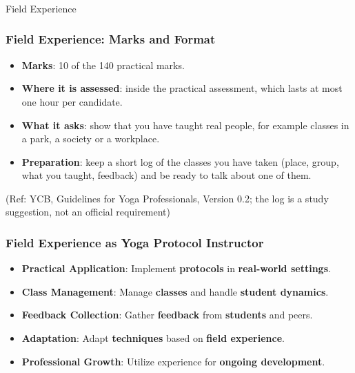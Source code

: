 \begin{frame}[fragile]\frametitle{}
\begin{center}
{\Large Field Experience }
\end{center}
\end{frame}

\begin{frame}[fragile]\frametitle{Field Experience: Marks and Format}
\begin{itemize}
\item \textbf{Marks}: 10 of the 140 practical marks.
\item \textbf{Where it is assessed}: inside the practical assessment, which lasts at most one hour per candidate.
\item \textbf{What it asks}: show that you have taught real people, for example classes in a park, a society or a workplace.
\item \textbf{Preparation}: keep a short log of the classes you have taken (place, group, what you taught, feedback) and be ready to talk about one of them.
\end{itemize}
{\tiny (Ref: YCB, Guidelines for Yoga Professionals, Version 0.2; the log is a study suggestion, not an official requirement)}
\end{frame}

\begin{frame}[fragile]\frametitle{Field Experience as Yoga Protocol Instructor}

      \begin{itemize}
        \item \textbf{Practical Application}: Implement \textbf{protocols} in \textbf{real-world settings}.
        \item \textbf{Class Management}: Manage \textbf{classes} and handle \textbf{student dynamics}.
        \item \textbf{Feedback Collection}: Gather \textbf{feedback} from \textbf{students} and peers.
        \item \textbf{Adaptation}: Adapt \textbf{techniques} based on \textbf{field experience}.
        \item \textbf{Professional Growth}: Utilize experience for \textbf{ongoing development}.
      \end{itemize}

\end{frame}
